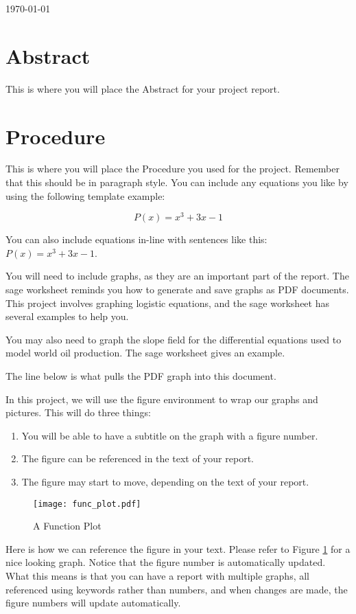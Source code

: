 \documentclass[11pt]{article}
\begin{document}
\today

\begin{report}
\section{Abstract}
This is where you will place the Abstract for your project report.

\section{Procedure}
This is where you will place the Procedure you used for the project. Remember that this should be in paragraph style. You can include any equations you like by using the following template example:

\[
    P(x) = x^3 + 3x - 1
\]

You can also include equations in-line with sentences like this: $P(x)=x^3+3x-1$.

You will need to include graphs, as they are an important part of the report. The sage worksheet reminds you how to generate and save graphs as PDF documents. This project involves graphing logistic equations, and the sage worksheet has several examples to help you.

You may also need to graph the slope field for the differential equations used to model world oil production. The sage worksheet gives an example.

The line below is what pulls the PDF graph into this document.

In this project, we will use the figure environment to wrap our graphs and pictures. This will do three things:
\begin{enumerate}
    \item You will be able to have a subtitle on the graph with a figure number.
    \item The figure can be referenced in the text of your report.
    \item The figure may start to move, depending on the text of your report.
\end{enumerate}

\begin{figure}
\texttt{[image: func\_plot.pdf]}
\caption{\label{l_func_plot} A Function Plot}
\end{figure}

Here is how we can reference the figure in your text. Please refer to Figure \ref{l_func_plot} for a nice looking graph. Notice that the figure number is automatically updated. What this means is that you can have a report with multiple graphs, all referenced using keywords rather than numbers, and when changes are made, the figure numbers will update automatically.


\end{report}
\end{document}
